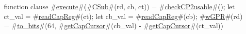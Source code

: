 function clause #\hyperref[zexecute]{execute}#(#\hyperref[zCSub]{CSub}#(rd, cb, ct)) = 
{
  #\hyperref[zcheckCP2usable]{checkCP2usable}#();
  let ct_val = #\hyperref[zreadCapReg]{readCapReg}#(ct);
  let cb_val = #\hyperref[zreadCapReg]{readCapReg}#(cb);
  #\hyperref[zwGPR]{wGPR}#(rd) = #\hyperref[ztozybits]{to\_bits}#(64, #\hyperref[zgetCapCursor]{getCapCursor}#(cb_val) - #\hyperref[zgetCapCursor]{getCapCursor}#(ct_val))
}
